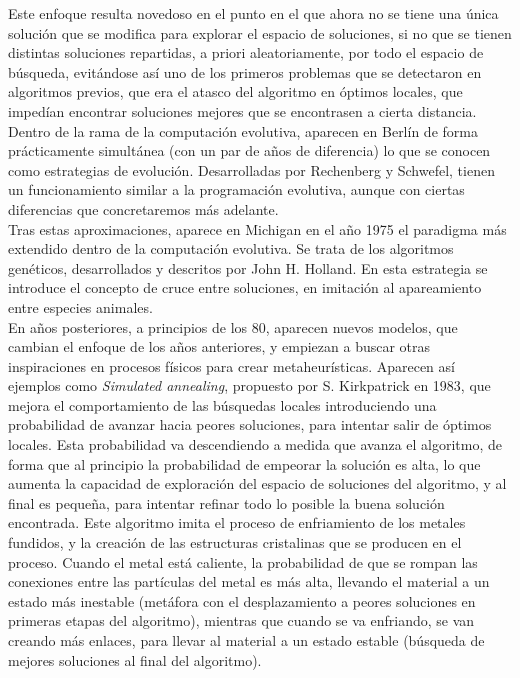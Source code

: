\documentclass[12pt]{article} \usepackage[utf8x]{inputenc}
\begin{document}
Este enfoque resulta novedoso en el punto en el que ahora no se tiene
una única solución que se modifica para explorar el espacio de
soluciones, si no que se tienen distintas soluciones repartidas, a
priori aleatoriamente, por todo el espacio de búsqueda, evitándose así
uno de los primeros problemas que se detectaron en algoritmos previos,
que era el atasco del algoritmo en óptimos locales, que impedían
encontrar soluciones mejores que se encontrasen a cierta distancia.\\

Dentro de la rama de la computación evolutiva, aparecen en Berlín de
forma prácticamente simultánea (con un par de años de diferencia) lo
que se conocen como estrategias de evolución. Desarrolladas por
Rechenberg y Schwefel, tienen un funcionamiento similar a la
programación evolutiva, aunque con ciertas diferencias que
concretaremos más adelante.\\

Tras estas aproximaciones, aparece en Michigan en el año 1975 el
paradigma más extendido dentro de la computación evolutiva. Se trata
de los algoritmos genéticos, desarrollados y descritos por John H.
Holland. En esta estrategia se introduce el concepto de cruce entre
soluciones, en imitación al apareamiento entre especies animales.\\

En años posteriores, a principios de los 80, aparecen nuevos modelos,
que cambian el enfoque de los años anteriores, y empiezan a buscar
otras inspiraciones en procesos físicos para crear metaheurísticas.
Aparecen así ejemplos como \textit{Simulated annealing}, propuesto por
S. Kirkpatrick en 1983, que mejora el comportamiento de las búsquedas
locales introduciendo una probabilidad de avanzar hacia peores
soluciones, para intentar salir de óptimos locales. Esta probabilidad
va descendiendo a medida que avanza el algoritmo, de forma que al
principio la probabilidad de empeorar la solución es alta, lo que
aumenta la capacidad de exploración del espacio de soluciones del
algoritmo, y al final es pequeña, para intentar refinar todo lo
posible la buena solución encontrada. Este algoritmo imita el proceso
de enfriamiento de los metales fundidos, y la creación de las
estructuras cristalinas que se producen en el proceso. Cuando el metal
está caliente, la probabilidad de que se rompan las conexiones entre
las partículas del metal es más alta, llevando el material a un estado
más inestable (metáfora con el desplazamiento a peores soluciones en
primeras etapas del algoritmo), mientras que cuando se va enfriando,
se van creando más enlaces, para llevar al material a un estado
estable (búsqueda de mejores soluciones al final del algoritmo).\\
\end{document}
